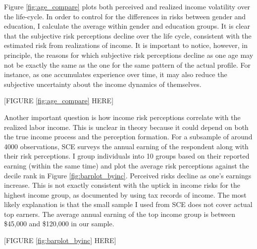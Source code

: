  Figure
\ref{fig:age_compare} plots both perceived and realized income volatility over the life-cycle. In order to control for the differences in risks between gender and education, I calculate the average within gender and education groups. It is clear that the subjective risk perceptions decline over the life cycle, consistent with the estimated risk from realizations of income. It is important to notice, however, in principle, the reasons for which subjective risk perceptions decline as one age may not be exactly the same as the one for the same pattern of the actual profile. For instance,  as one accumulates experience over time, it may also reduce the subjective uncertainty about the income dynamics of themselves. 

\begin{center}
 [FIGURE \ref{fig:age_compare} HERE]
 \end{center}
 
Another important question is how income risk perceptions correlate with the
realized labor income. This is unclear in theory because it could depend on both the true
income process and the perception formation. For a subsample of around 4000 observations, SCE surveys the annual earning of the respondent along with their risk perceptions. I group individuals into 10 groups based on their reported earning (within the same time) and plot the average risk perceptions against the decile rank in Figure \ref{fig:barplot_byinc}. Perceived risks decline as one's earnings increase.  This is not exactly consistent with the uptick in income risks for the highest income group, as documented by \cite{bloom2018great} using tax records of income. The most likely explanation is that the small sample I used from SCE does not cover actual top earners. The average annual earning of the top income group is between \$45,000 and \$120,000 in our sample.  

\begin{center}
 [FIGURE \ref{fig:barplot_byinc} HERE]
\end{center}

